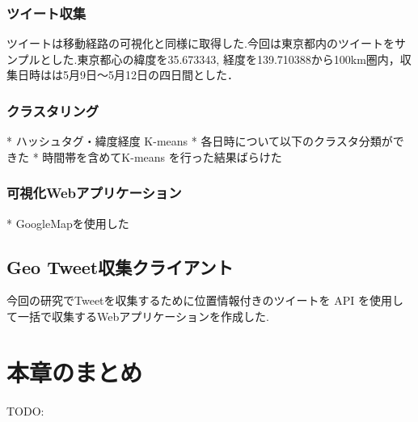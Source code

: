 \subsubsection{ツイート収集}
ツイートは移動経路の可視化と同様に取得した.今回は東京都内のツイートをサンプルとした.東京都心の緯度を35.673343, 経度を139.710388から100km圏内，収集日時はは5月9日〜5月12日の四日間とした．

\subsubsection{クラスタリング}
* ハッシュタグ・緯度経度 K-means
* 各日時について以下のクラスタ分類ができた
* 時間帯を含めてK-means を行った結果ばらけた


\subsubsection{可視化Webアプリケーション}
* GoogleMapを使用した

\subsection{Geo Tweet収集クライアント}
今回の研究でTweetを収集するために位置情報付きのツイートを API を使用して一括で収集するWebアプリケーションを作成した.


\newpage

\section{本章のまとめ}
TODO:




\newpage
